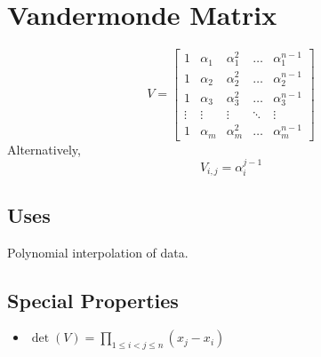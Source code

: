 \section{Vandermonde Matrix}
\begin{equation}
V=
\begin{bmatrix}
1      & \alpha_1 & \alpha_1^2 & \dots  & \alpha_1^{n-1} \\
1      & \alpha_2 & \alpha_2^2 & \dots  & \alpha_2^{n-1} \\
1      & \alpha_3 & \alpha_3^2 & \dots  & \alpha_3^{n-1} \\
\vdots & \vdots   & \vdots     & \ddots & \vdots         \\
1      & \alpha_m & \alpha_m^2 & \dots  & \alpha_m^{n-1}
\end{bmatrix}
\end{equation}
Alternatively,
\begin{equation}
V_{i,j} = \alpha_i^{j-1}
\end{equation}

\subsection*{Uses}
Polynomial interpolation of data.

\subsection*{Special Properties}
\begin{itemize}
\item $\det(V)=\prod_{1\le i < j \le n} (x_j-x_i)$
\end{itemize}